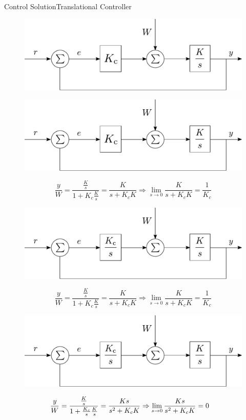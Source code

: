 \begin{frame}{Control Solution}{Translational Controller}

  {
    \begin{figure}[H]
      \hspace*{-.8cm}
      \includegraphics[width=.5\textwidth]{figures/disturbanceP}
    \end{figure}
    \vspace*{1.72cm}
  }

  {
    \begin{figure}[H]
      \hspace*{-.8cm}
      \includegraphics[width=.5\textwidth]{figures/disturbanceP}
    \end{figure}
    \vspace*{.5cm}
    \[
      \frac{y}{W}=\frac{\frac{K}{s}}{1+K_c \frac{K}{s}}=\frac{K}{s+K_c K}
      \Rightarrow \lim_{s \to 0} \frac{K}{s+K_c K} = \frac{1}{K_c}
    \]
  }
  
  {
    \begin{figure}[H]
      \hspace*{-.8cm}
      \includegraphics[width=.5\textwidth]{figures/disturbancePI}
    \end{figure}
    \vspace*{.5cm}
    \[
      \frac{y}{W}=\frac{\frac{K}{s}}{1+K_c \frac{K}{s}}=\frac{K}{s+K_c K}
      \Rightarrow \lim_{s \to 0} \frac{K}{s+K_c K} = \frac{1}{K_c}
    \]
  }

  {
    \begin{figure}[H]
      \hspace*{-.8cm}
      \includegraphics[width=.5\textwidth]{figures/disturbancePI}
    \end{figure}
    \vspace*{.5cm}
    \[\hspace{-.35cm}
      \frac{y}{W}=\frac{\frac{K}{s}}{1+\frac{K_c}{s} \frac{K}{s}} = \frac{Ks}{s^2+K_c K}
      \Rightarrow \lim_{s \to 0} \frac{Ks}{s^2+K_c K} = 0
    \]
  }

\end{frame}

